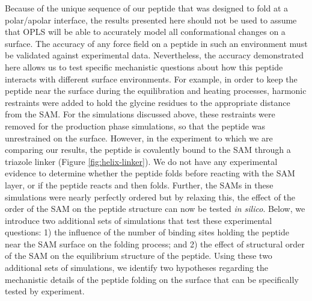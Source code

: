 Because of the unique sequence of our peptide that was designed to fold at a polar/apolar interface, the results presented here should not be used to assume that OPLS will be able to accurately model all conformational changes on a surface. 
The accuracy of any force field on a peptide in such an environment must be validated against experimental data. 
Nevertheless, the accuracy demonstrated here allows us to test specific mechanistic questions about how this peptide interacts with different surface environments. 
For example, in order to keep the peptide near the surface during the equilibration and heating processes, harmonic restraints were added to hold the glycine residues to the appropriate distance from the SAM. 
For the simulations discussed above, these restraints were removed for the production phase simulations, so that the peptide was unrestrained on the surface. 
However, in the experiment to which we are comparing our results, the peptide is covalently bound to the SAM through a triazole linker (Figure \ref{fig:helix-linker}). 
We do not have any experimental evidence to determine whether the peptide folds before reacting with the SAM layer, or if the peptide reacts and then folds. 
Further, the SAMs in these simulations were nearly perfectly ordered but by relaxing this, the effect of the order of the SAM on the peptide structure can now be tested \emph{in silico}. 
Below, we introduce two additional sets of simulations that test these experimental questions: 
1) the influence of the number of binding sites holding the peptide near the SAM surface on the folding process; and 
2) the effect of structural order of the SAM on the equilibrium structure of the peptide. 
Using these two additional sets of simulations, we identify two hypotheses regarding the mechanistic details of the peptide folding on the surface that can be specifically tested by experiment. 

